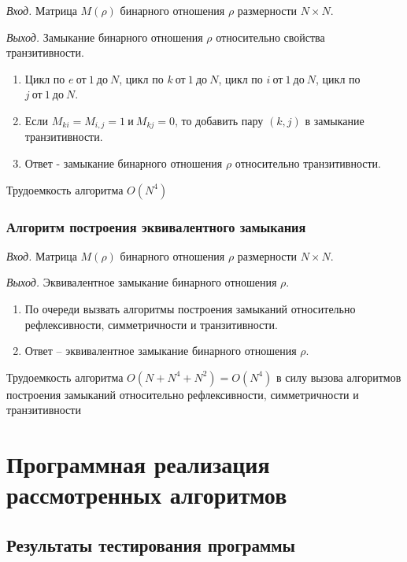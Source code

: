 \documentclass[bachelor, och, labwork]{shiza}
\begin{document}

\textit{Вход.} Матрица $M(\rho)$ бинарного отношения $\rho$ размерности
$N \times N$.

\textit{Выход.} Замыкание бинарного отношения $\rho$ относительно свойства транзитивности.

\begin{enumerate}
    \item Цикл по $e ~\text{от}~ 1 ~\text{до}~ N$, цикл по $k ~\text{от}~ 1 ~\text{до}~ N$, 
    цикл по $i ~\text{от}~ 1 ~\text{до}~ N$, цикл по $j ~\text{от}~ 1 ~\text{до}~ N$.
    \item Если $M_{ki}=M_{i,j}=1 ~\text{и}~ M_{kj}=0$, то добавить пару
    $(k, j)$ в замыкание транзитивности.
    \item Ответ - замыкание бинарного отношения $\rho$ относительно транзитивности.
\end{enumerate}
Трудоемкость алгоритма $O(N^4)$


\subsubsection{Алгоритм построения эквивалентного замыкания}

\textit{Вход.} Матрица $M(\rho)$ бинарного отношения $\rho$ размерности
$N \times N$.

\textit{Выход.} Эквивалентное замыкание бинарного отношения $\rho$.


\begin{enumerate}
    \item По очереди вызвать алгоритмы построения замыканий относительно рефлексивности,
    симметричности и транзитивности.
    \item Ответ -- эквивалентное замыкание бинарного отношения $\rho$.
\end{enumerate}
Трудоемкость алгоритма $O(N+N^4+N^2) = O(N^4)$ в силу вызова алгоритмов построения
замыканий относительно рефлексивности, симметричности и транзитивности

\section{Программная реализация рассмотренных алгоритмов}
    
    \subsection{Результаты тестирования программы}
\end{document}
